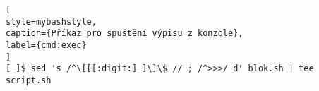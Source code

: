 \begin{lstfloat}
\begin{lstlisting}[
style=mybashstyle,
caption={Příkaz pro spuštění výpisu z konzole},
label={cmd:exec}
]
[_]$ sed 's /^\[[[:digit:]_]\]\$ // ; /^>>>/ d' blok.sh | tee script.sh
\end{lstlisting}
\end{lstfloat}